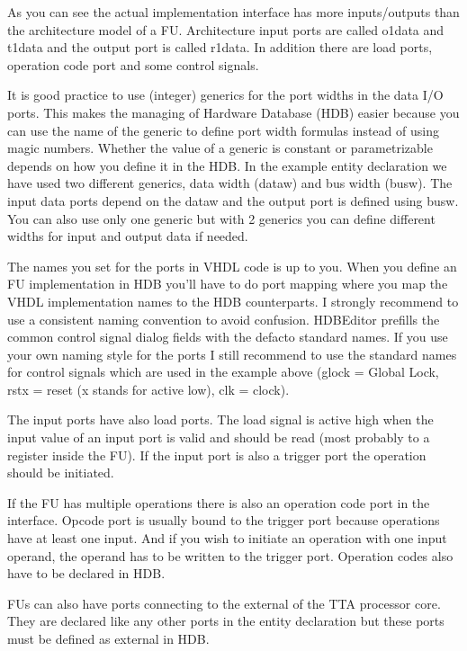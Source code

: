 \documentclass[a4paper,twoside]{tceusermanual}
\begin{document}
As you can see the actual implementation interface has more inputs/outputs
than the architecture model of a FU. Architecture input ports are
called o1data and t1data and the output port is called r1data. In addition
there are load ports, operation code port and some control signals.

It is good practice to use (integer) generics for the port widths in the data
I/O ports. This makes the managing of Hardware Database (HDB) easier because
you can use the name of the generic to define port width formulas instead of
using magic numbers. Whether the value of a generic is constant or
parametrizable depends on how you define it in the HDB. In the example
entity declaration we have used two different generics, data width (dataw)
and bus width (busw). The input data ports depend on the dataw and the
output port is defined using busw. You can also use only one generic but
with 2 generics you can define different widths for input and output data if
needed.

The names you set for the ports in VHDL code is up to you. When you define
an FU implementation in HDB you'll have to do port mapping where you map the
VHDL implementation names to the HDB counterparts. I strongly recommend to
use a consistent naming convention to avoid confusion. HDBEditor prefills 
the common control signal dialog fields with the defacto standard
names. If you use your own naming style for the ports I still recommend to
use the standard names for control signals which are used in the example
above (glock = Global Lock, rstx = reset (x stands for active low), clk =
clock).

The input ports have also load ports. The load signal is active high when the
input value of an input port is valid and should be read (most probably to a
register inside the FU). If the input port is also a trigger port the
operation should be initiated.

If the FU has multiple operations there is also an operation code port in the
interface. Opcode port is usually bound to the trigger port because operations
have at least one input. And if you wish to initiate an operation with one
input operand, the operand has to be written to the trigger port. Operation
codes also have to be declared in HDB.

FUs can also have ports connecting to the external of the TTA processor
core. They are declared like any other ports in the entity declaration but
these ports must be defined as external in HDB.
\end{document}
